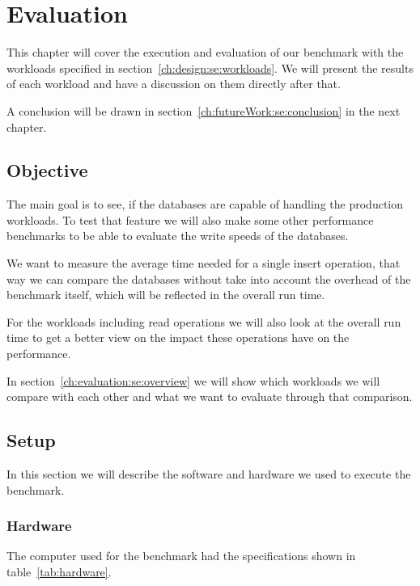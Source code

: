 \chapter{Evaluation}
\label{ch:evaluation}
This chapter will cover the execution and evaluation of our benchmark with the workloads specified in section~\ref{ch:design:se:workloads}.
We will present the results of each workload and have a discussion on them directly after that.

A conclusion will be drawn in section~\ref{ch:futureWork:se:conclusion} in the next chapter.

\section{Objective}
The main goal is to see,
if the databases are capable of handling the production workloads.
To test that feature we will also make some other performance benchmarks to be able to evaluate the write speeds of the databases.

We want to measure the average time needed for a single insert operation,
that way we can compare the databases without take into account the overhead of the benchmark itself,
which will be reflected in the overall run time.

For the workloads including read operations we will also look at the overall run time to get a better view on the impact these operations have on the performance.

In section~\ref{ch:evaluation:se:overview} we will show which workloads we will compare with each other and what we want to evaluate through that comparison.

\section{Setup}
In this section we will describe the software and hardware we used to execute the benchmark.


\subsection{Hardware}
The computer used for the benchmark had the specifications shown in table~\ref{tab:hardware}.

